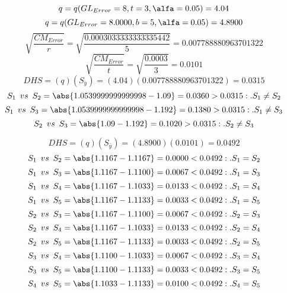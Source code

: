 $$q=q(GL_{Error}=8, t=3, \alfa=0.05)=4.04$$
$$q=q(GL_{Error}=8.0000, b=5, \alfa=0.05)=4.8900$$
$$\sqrt{\frac{CM_{Error}}{r}}=\sqrt{\frac{0.0003033333333335442}{5}}=0.007788880963701322$$
$$\sqrt{\frac{CM_{Error}}{t}}=\sqrt{\frac{0.0003}{3}}=0.0101$$
$$DHS=(q)(S_{\bar{y}})=(4.04)(0.007788880963701322)=0.0315$$
$$S_{1} \enspace vs \enspace S_{2} = \abs{1.0539999999999998-1.09}=0.0360>0.0315:.S_{1}\not=S_{2}$$
$$S_{1} \enspace vs \enspace S_{3} = \abs{1.0539999999999998-1.192}=0.1380>0.0315:.S_{1}\not=S_{3}$$
$$S_{2} \enspace vs \enspace S_{3} = \abs{1.09-1.192}=0.1020>0.0315:.S_{2}\not=S_{3}$$

$$DHS=(q)(S_{\bar{y}})=(4.8900)(0.0101)=0.0492$$
$$S_{1} \enspace vs \enspace S_{2} = \abs{1.1167-1.1167}=0.0000<0.0492:.S_{1}=S_{2}$$
$$S_{1} \enspace vs \enspace S_{3} = \abs{1.1167-1.1100}=0.0067<0.0492:.S_{1}=S_{3}$$
$$S_{1} \enspace vs \enspace S_{4} = \abs{1.1167-1.1033}=0.0133<0.0492:.S_{1}=S_{4}$$
$$S_{1} \enspace vs \enspace S_{5} = \abs{1.1167-1.1133}=0.0033<0.0492:.S_{1}=S_{5}$$
$$S_{2} \enspace vs \enspace S_{3} = \abs{1.1167-1.1100}=0.0067<0.0492:.S_{2}=S_{3}$$
$$S_{2} \enspace vs \enspace S_{4} = \abs{1.1167-1.1033}=0.0133<0.0492:.S_{2}=S_{4}$$
$$S_{2} \enspace vs \enspace S_{5} = \abs{1.1167-1.1133}=0.0033<0.0492:.S_{2}=S_{5}$$
$$S_{3} \enspace vs \enspace S_{4} = \abs{1.1100-1.1033}=0.0067<0.0492:.S_{3}=S_{4}$$
$$S_{3} \enspace vs \enspace S_{5} = \abs{1.1100-1.1133}=0.0033<0.0492:.S_{3}=S_{5}$$
$$S_{4} \enspace vs \enspace S_{5} = \abs{1.1033-1.1133}=0.0100<0.0492:.S_{4}=S_{5}$$

